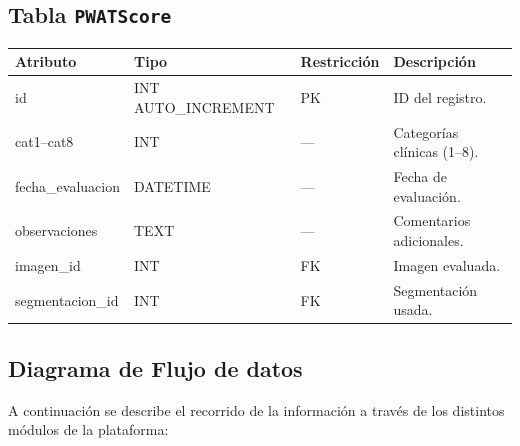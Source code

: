 \subsection*{Tabla \texttt{PWATScore}}
{\footnotesize
\begin{tabularx}{\textwidth}{l l l X}
\hline
\textbf{Atributo}      & \textbf{Tipo}         & \textbf{Restricción} & \textbf{Descripción} \\\hline
id                    & INT AUTO\_INCREMENT   & PK                   & ID del registro. \\
cat1–cat8             & INT                   & —                    & Categorías clínicas (1–8). \\
fecha\_evaluacion     & DATETIME              & —                    & Fecha de evaluación. \\
observaciones         & TEXT                  & —                    & Comentarios adicionales. \\
imagen\_id            & INT                   & FK                   & Imagen evaluada. \\
segmentacion\_id      & INT                   & FK                   & Segmentación usada. \\\hline
\end{tabularx}
}

\subsection{Diagrama de Flujo de datos}

A continuación se describe el recorrido de la información a través de los distintos módulos de la plataforma:

